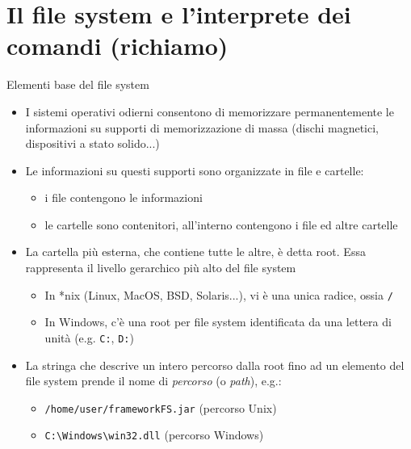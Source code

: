 \documentclass[xcolor=dvipsnames,presentation]{beamer}
\begin{document}
\section{Il file system e l'interprete dei comandi (richiamo)}

\begin{frame}{Elementi base del file system}
  \begin{itemize}
    \item I sistemi operativi odierni consentono di memorizzare permanentemente le informazioni su
supporti di memorizzazione di massa (dischi magnetici, dispositivi a stato solido...)
    \item Le informazioni su questi supporti sono organizzate in file e cartelle:
      \begin{itemize}
        \item i file contengono le informazioni
        \item le cartelle sono contenitori, all'interno contengono i file ed altre cartelle
      \end{itemize}
    \item La cartella più esterna, che contiene tutte le altre, è detta root. Essa rappresenta il livello gerarchico più alto del file system
      \begin{itemize}
        \item In *nix (Linux, MacOS, BSD, Solaris...), vi è una unica radice, ossia \texttt{/}
        \item In Windows, c'è una root per file system identificata da una lettera di unità (e.g.
\texttt{C:}, \texttt{D:})
      \end{itemize}
    \item La stringa che descrive un intero percorso dalla root fino ad un elemento del file system
prende il nome di \emph{percorso} (o \emph{path}), e.g.:
    \begin{itemize}
        \item \texttt{/home/user/frameworkFS.jar} (percorso Unix)
        \item \texttt{C:\textbackslash{}Windows\textbackslash{}win32.dll} (percorso Windows)
    \end{itemize}
  \end{itemize}
\end{frame}
\end{document}
